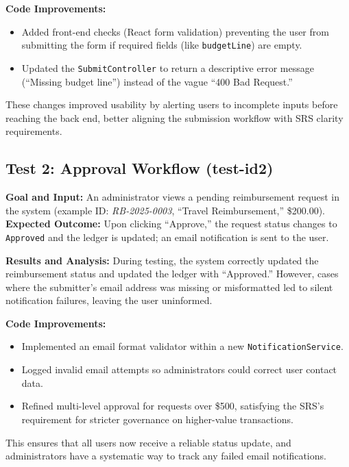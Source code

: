 \documentclass[12pt, titlepage]{article}
\begin{document}
\noindent
\textbf{Code Improvements:}
\begin{itemize}
  \item Added front-end checks (React form validation) preventing the user from submitting the form if required fields (like \texttt{budgetLine}) are empty.
  \item Updated the \texttt{SubmitController} to return a descriptive error message (“Missing budget line”) instead of the vague “400 Bad Request.”
\end{itemize}
These changes improved usability by alerting users to incomplete inputs before reaching the back end, better aligning the submission workflow with SRS clarity requirements.


\subsection{Test 2: Approval Workflow (test-id2)}

\noindent
\textbf{Goal and Input:}  
An administrator views a pending reimbursement request in the system (example ID: \emph{RB-2025-0003}, “Travel Reimbursement,” \$200.00).  
\textbf{Expected Outcome:} Upon clicking “Approve,” the request status changes to \texttt{Approved} and the ledger is updated; an email notification is sent to the user.

\noindent
\textbf{Results and Analysis:}  
During testing, the system correctly updated the reimbursement status and updated the ledger with “Approved.” However, cases where the submitter’s email address was missing or misformatted led to silent notification failures, leaving the user uninformed.

\noindent
\textbf{Code Improvements:}
\begin{itemize}
  \item Implemented an email format validator within a new \texttt{NotificationService}.
  \item Logged invalid email attempts so administrators could correct user contact data.
  \item Refined multi-level approval for requests over \$500, satisfying the SRS’s requirement for stricter governance on higher-value transactions.
\end{itemize}
This ensures that all users now receive a reliable status update, and administrators have a systematic way to track any failed email notifications.
\end{document}
